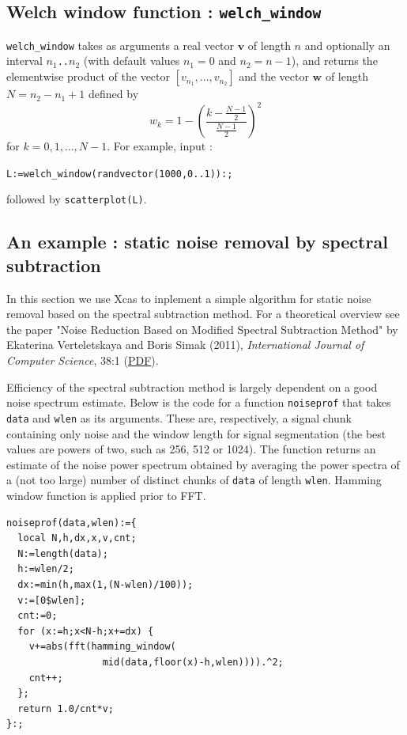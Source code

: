 \documentclass[a4paper,11pt]{book}
\begin{document}
\subsection{Welch window function : {\tt welch\_window}}
{\tt welch\_window} takes as arguments a real vector $ \mathbf{v} $ of length $ n $ and optionally an interval $ n_1 ${\tt ..}$ n_2 $ (with default values $ n_1=0 $ and $ n_2=n-1 $), and returns the elementwise product of the vector $ [v_{n_1},\dots,v_{n_2}] $ and the vector $ \mathbf{w} $ of length $ N=n_2-n_1+1 $ defined by
\[ w_k=1-\left(\frac{k-\frac{N-1}{2}}{\frac{N-1}{2}}\right)^2 \]
for $ k=0,1,\dots,N-1 $. For example, input :
\begin{center}
	{\tt L:=welch\_window(randvector(1000,0..1)):;}
\end{center}
followed by {\tt scatterplot(L)}.

\subsection{An example : static noise removal by spectral subtraction}
In this section we use Xcas to inplement a simple algorithm for static noise removal based on the spectral subtraction method. For a theoretical overview see the paper "Noise Reduction Based on Modified Spectral Subtraction Method" by Ekaterina Verteletskaya and Boris Simak (2011), \emph{International Journal of Computer Science}, 38:1 (\href{https://pdfs.semanticscholar.org/c212/84207dcf8e95b8b44d0ce703f9fe23b28f2a.pdf}{PDF}).

Efficiency of the spectral subtraction method is largely dependent on a good noise spectrum estimate. Below is the code for a function {\tt noiseprof} that takes {\tt data} and {\tt wlen} as its arguments. These are, respectively, a signal chunk containing only noise and the window length for signal segmentation (the best values are powers of two, such as 256, 512 or 1024). The function returns an estimate of the noise power spectrum obtained by averaging the power spectra of a (not too large) number of distinct chunks of {\tt data} of length {\tt wlen}. Hamming window function is applied prior to FFT.
\begin{verbatim}
noiseprof(data,wlen):={
  local N,h,dx,x,v,cnt;
  N:=length(data);
  h:=wlen/2;
  dx:=min(h,max(1,(N-wlen)/100));
  v:=[0$wlen];
  cnt:=0;
  for (x:=h;x<N-h;x+=dx) {
    v+=abs(fft(hamming_window(
                 mid(data,floor(x)-h,wlen)))).^2;
    cnt++;
  };
  return 1.0/cnt*v;
}:;
\end{verbatim}
\end{document}
